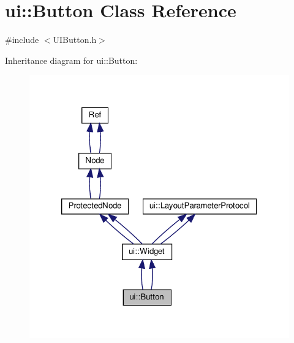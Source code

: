 \hypertarget{classui_1_1Button}{}\section{ui\+:\+:Button Class Reference}
\label{classui_1_1Button}


{\ttfamily \#include $<$U\+I\+Button.\+h$>$}



Inheritance diagram for ui\+:\+:Button\+:
\nopagebreak
\begin{figure}[H]
\begin{center}
\leavevmode
\includegraphics[width=320pt]{classui_1_1Button__inherit__graph}
\end{center}
\end{figure}


